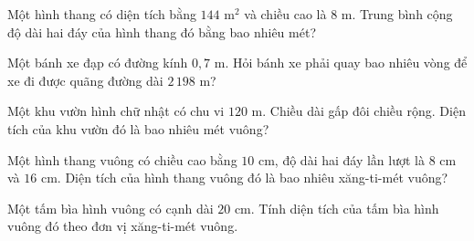 \begin{ex} %
Một hình thang có diện tích bằng $144\text{ m}^2$ và chiều cao là $8\text{ m}$. Trung bình cộng độ dài hai đáy của hình thang đó bằng bao nhiêu mét?
\end{ex}

\begin{ex} %
Một bánh xe đạp có đường kính $0{,}7\text{ m}$. Hỏi bánh xe phải quay bao nhiêu vòng để xe đi được quãng đường dài $2\,198\text{ m}$?
\end{ex}

\begin{ex} %
Một khu vườn hình chữ nhật có chu vi $120\text{ m}$. Chiều dài gấp đôi chiều rộng. Diện tích của khu vườn đó là bao nhiêu mét vuông?
\end{ex}

\begin{ex} %
Một hình thang vuông có chiều cao bằng $10\text{ cm}$, độ dài hai đáy lần lượt là $8\text{ cm}$ và $16\text{ cm}$. Diện tích của hình thang vuông đó là bao nhiêu xăng-ti-mét vuông?
\end{ex}

\begin{ex} %
Một tấm bìa hình vuông có cạnh dài $20\text{ cm}$. Tính diện tích của tấm bìa hình vuông đó theo đơn vị xăng-ti-mét vuông.
\end{ex}
